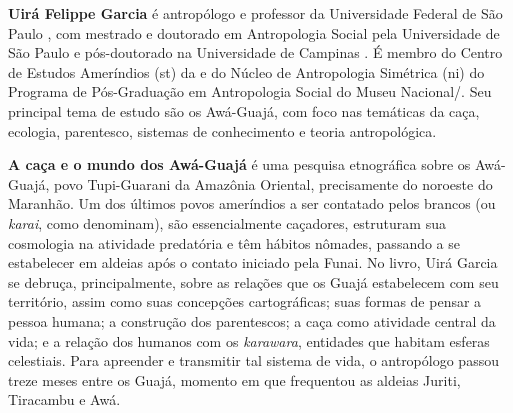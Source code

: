\textbf{Uirá Felippe Garcia} é antropólogo e professor da Universidade Federal de São Paulo , com mestrado e doutorado em Antropologia Social pela Universidade de São Paulo  e pós-doutorado na Universidade de Campinas . É membro do Centro de Estudos Ameríndios (st) da  e do Núcleo de Antropologia Simétrica (ni) do Programa de Pós-Graduação em Antropologia Social do Museu Nacional/. Seu principal tema de estudo são os Awá-Guajá, com foco nas temáticas da caça, ecologia, parentesco, sistemas de conhecimento e teoria antropológica.

	
\textbf{A caça e o mundo dos Awá-Guajá} é uma pesquisa etnográfica sobre os Awá-Guajá, povo Tupi-Guarani da Amazônia Oriental, precisamente do noroeste do Maranhão. Um dos últimos povos ameríndios a ser contatado pelos brancos (ou \emph{karai}, como denominam), são essencialmente caçadores, estruturam sua cosmologia na atividade predatória e têm hábitos nômades, passando a se estabelecer em aldeias após o contato iniciado pela Funai. No livro, Uirá Garcia se debruça, principalmente, sobre as relações que os Guajá estabelecem com seu território, assim como suas concepções cartográficas; suas formas de pensar a pessoa humana; a construção dos parentescos; a caça como atividade central da vida; e a relação dos humanos com os \emph{karawara}, entidades que habitam esferas celestiais. Para apreender e transmitir tal sistema de vida, o antropólogo passou treze meses entre os Guajá, momento em que frequentou as aldeias Juriti, Tiracambu e Awá.